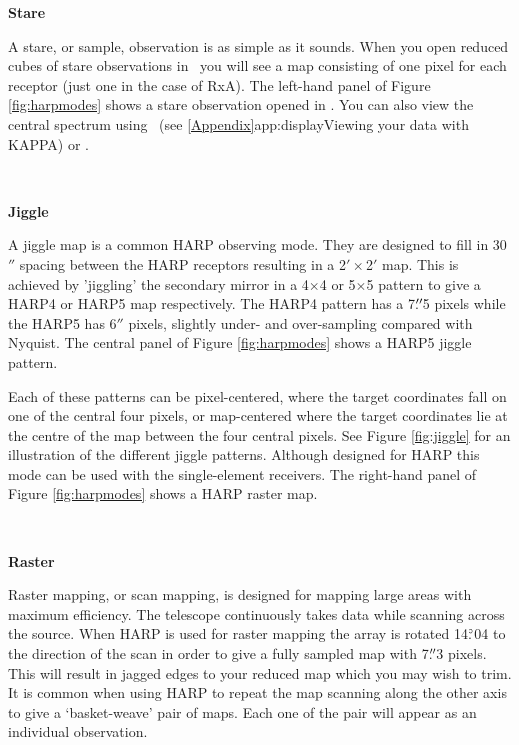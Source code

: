\documentclass[11pt,oneside,chapters]{starlink}
\newcommand{\dgs}{\si{\degree}}%
\newcommand{\dgs}{\HCode{&deg}}
\providecommand{\arcm}{\si{\arcminute}}%
\providecommand{\arcsec}{\si{\arcsecond}}%
\providecommand{\udeg}{\hspace{-0.3em}\dgs\hspace{-0.08em}}
\providecommand{\uarcs}{\hspace{-0.27em}\arcsec\hspace{-0.07em}}
\begin{document}
\begin{minipage}[t]{0.14\linewidth}
\textbf{Stare}
\end{minipage}
\begin{minipage}[t]{0.85\linewidth}
A stare, or sample, observation is as simple as it sounds. When you
open reduced cubes of stare observations in \gaia\ you will see a map
consisting of one pixel for each receptor (just one in the case of
RxA). The left-hand panel of Figure \ref{fig:harpmodes} shows a stare
observation opened in \gaia. You can also view the central spectrum
using \linplot\ (see \cref{Appendix}{app:display}{Viewing your data
with KAPPA}) or \splat.
\end{minipage}
\vspace{0.7cm}\\
\begin{minipage}[t]{0.14\linewidth}
\textbf{Jiggle}
\end{minipage}
\begin{minipage}[t]{0.85\linewidth}
A jiggle map is a common HARP observing mode. They are designed to
fill in 30$\arcsec$ spacing between the HARP receptors resulting in a
2$'\times$2$\arcm$ map. This is achieved by 'jiggling' the secondary
mirror in a 4$\times$4 or 5$\times$5 pattern to give a HARP4 or HARP5
map respectively.  The HARP4 pattern has a 7.$\uarcs$5 pixels while the
HARP5 has 6$\arcsec$ pixels, slightly under- and over-sampling compared
with Nyquist. The central panel of Figure \ref{fig:harpmodes} shows a
HARP5 jiggle pattern.

Each of these patterns can be pixel-centered, where the target
coordinates fall on one of the central four pixels, or map-centered where
the target coordinates lie at the centre of the map between the four
central pixels. See Figure \ref{fig:jiggle} for an illustration of the
different jiggle patterns. Although designed for HARP this mode can be
used with the single-element receivers. The right-hand panel of Figure
\ref{fig:harpmodes} shows a HARP raster map.
\end{minipage}
\vspace{0.7cm}\\
\begin{minipage}[t]{0.14\linewidth}
\textbf{Raster}
\end{minipage}
\begin{minipage}[t]{0.85\linewidth}
Raster mapping, or scan mapping, is designed for mapping large areas
with maximum efficiency. The telescope continuously takes data while
scanning across the source. When HARP is used for raster mapping the
array is rotated 14.$\udeg$04 to the direction of the scan in order
to give a fully sampled map with 7.$\uarcs$3 pixels. This will result in
jagged edges to your reduced map which you may wish to trim. It is
common when using HARP to repeat the map scanning along the other axis
to give a `basket-weave' pair of maps. Each one of the pair will
appear as an individual observation.
\end{minipage}
\end{document}
